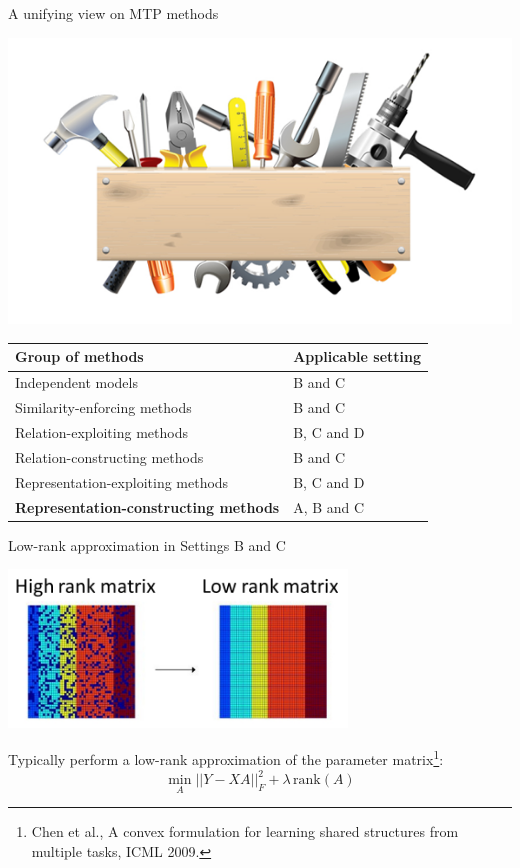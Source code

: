 \documentclass[]{beamer}
\renewcommand{\alert}[1]{\textbf{\color{putblue} #1}}
\begin{document}
\begin{frame}{A unifying view on MTP methods}

\begin{center}
\includegraphics[scale=0.3]{pics/tools}

\begin{tabular}{ll}
\hline
Group of methods & Applicable setting \\
\hline
\hline
Independent models & B and C \\
Similarity-enforcing methods & B and C   \\ 
Relation-exploiting methods & B, C and D  \\
Relation-constructing methods & B and C \\
Representation-exploiting methods & B, C and D \\
\alert{Representation-constructing methods} & A, B and C \\
\hline  
\end{tabular}
\end{center}
\end{frame}

\begin{frame}{Low-rank approximation in Settings B and C}

\begin{center}
\includegraphics[width=9cm]{pics/lowrank}
\end{center}
Typically perform a low-rank approximation of the parameter matrix\footnote{Chen et al., A convex formulation for learning shared structures from
multiple tasks, ICML 2009. }:
$$\min_A ||Y - XA ||^2_F + \lambda \, \mathrm{rank}(A)$$

\end{frame}
\end{document}
